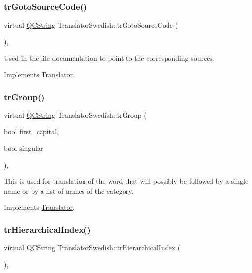 \subsubsection{\texorpdfstring{trGotoSourceCode()}{trGotoSourceCode()}}
{\footnotesize\ttfamily virtual \mbox{\hyperlink{class_q_c_string}{Q\+C\+String}} Translator\+Swedish\+::tr\+Goto\+Source\+Code (\begin{DoxyParamCaption}{ }\end{DoxyParamCaption})\hspace{0.3cm}{\ttfamily [inline]}, {\ttfamily [virtual]}}

Used in the file documentation to point to the corresponding sources. 

Implements \mbox{\hyperlink{class_translator}{Translator}}.

\mbox{\label{class_translator_swedish_a19b0e56378fccc350129ad5fbb64fc4a}} 
\subsubsection{\texorpdfstring{trGroup()}{trGroup()}}
{\footnotesize\ttfamily virtual \mbox{\hyperlink{class_q_c_string}{Q\+C\+String}} Translator\+Swedish\+::tr\+Group (\begin{DoxyParamCaption}\item[{bool}]{first\+\_\+capital,  }\item[{bool}]{singular }\end{DoxyParamCaption})\hspace{0.3cm}{\ttfamily [inline]}, {\ttfamily [virtual]}}

This is used for translation of the word that will possibly be followed by a single name or by a list of names of the category. 

Implements \mbox{\hyperlink{class_translator}{Translator}}.

\mbox{\label{class_translator_swedish_ab06aafbf663e029882b8255c82e967fe}} 
\subsubsection{\texorpdfstring{trHierarchicalIndex()}{trHierarchicalIndex()}}
{\footnotesize\ttfamily virtual \mbox{\hyperlink{class_q_c_string}{Q\+C\+String}} Translator\+Swedish\+::tr\+Hierarchical\+Index (\begin{DoxyParamCaption}{ }\end{DoxyParamCaption})\hspace{0.3cm}{\ttfamily [inline]}, {\ttfamily [virtual]}}


